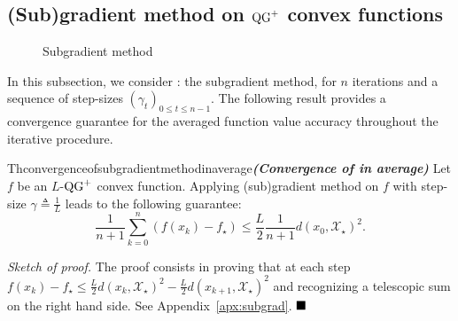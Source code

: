     \subsection{\texorpdfstring{(Sub)gradient method on $\operatorname{QG}^+$ convex functions}{(Sub)gradient method on QG+ convex functions}}\label{subsec:subgradient_method_on_qg+convex_functions}
        
        \begin{wrapfigure}[5]{R}{0.4\textwidth}
            \vspace{-1.8cm}
            \begin{minipage}{0.4\textwidth}
                \begin{algorithm}[H]
                    \caption{Subgradient method}\label{alg:subgrad}
                \end{algorithm}
            \end{minipage}
        \end{wrapfigure}
        In this subsection, we consider : the subgradient method, for $n$ iterations and a sequence of step-sizes $(\gamma_{t})_{0\le t\le n-1 }$.
        The following result provides a convergence guarantee for the averaged function value accuracy throughout the iterative procedure.

        \begin{restatable}{Th}{convergenceofsubgradientmethodinaverage}\textbf{\emph{(Convergence of  in average)}}
            \label{thm:gd_average}
            Let $f$ be an $L$-$\operatorname{QG}^+$ convex function.
            Applying (sub)gradient method on $f$ with step-size $\gamma \triangleq \frac{1}{L}$ leads to the following guarantee:
            \begin{equation}
                \frac{1}{n+1}\sum_{k=0}^n (f(x_k) - f_\star) \leq \frac{L}{2}\frac{1}{n+1} d(x_0, \mathcal{X}_\star)^2.
            \end{equation}
        \end{restatable}

        \noindent \textit{Sketch of proof.}
            The proof consists in proving that at each step
            $f(x_k) - f_\star \leq \frac{L}{2}d(x_k, \mathcal{X}_\star)^2 - \frac{L}{2}d(x_{k+1}, \mathcal{X}_\star)^2$
            and recognizing a telescopic sum on the right hand side.
            See Appendix~\ref{apx:subgrad}.
        $\hfill\blacksquare$


